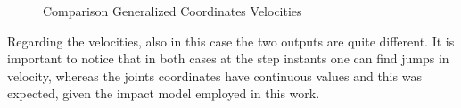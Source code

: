 \documentclass[11pt]{article}
\begin{document}
\begin{figure}[H]
\centering
{} \quad
{}
\caption{Comparison Generalized Coordinates Velocities}
\end{figure}

Regarding the velocities, also in this case the two outputs are quite different. It is important to notice that in both cases at the step instants one can find jumps in velocity, whereas the joints coordinates have continuous values and this was expected, given the impact model employed in this work.
\end{document}
